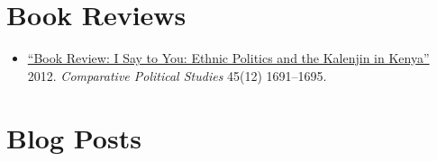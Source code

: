 \section{\sc Book Reviews}

\begin{itemize}[label={---},leftmargin=1.5em]
  \item \href{https://doi.org/10.1177/0010414012458252}{``Book Review: I Say to You: Ethnic Politics and the Kalenjin in Kenya''} 2012. \textit{Comparative Political Studies} 45(12) 1691–1695.

\end{itemize}

\section{\sc Blog Posts}

